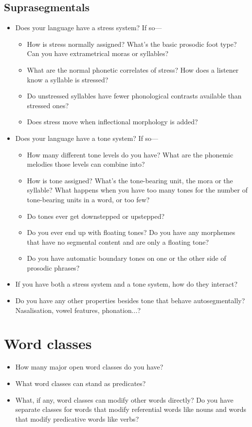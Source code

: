 \documentclass{article}
\begin{document}
\subsection{Suprasegmentals}
\begin{itemize}
  \item Does your language have a stress system? If so---
        \begin{itemize}
          \item How is stress normally assigned? What's the basic prosodic foot type? Can you have extrametrical moras or syllables?
          \item What are the normal phonetic correlates of stress? How does a listener know a syllable is stressed?
          \item Do unstressed syllables have fewer phonological contrasts available than stressed ones?
          \item Does stress move when inflectional morphology is added?
        \end{itemize}
  \item Does your language have a tone system? If so---
        \begin{itemize}
          \item How many different tone levels do you have? What are the phonemic melodies those levels can combine into?
          \item How is tone assigned? What's the tone-bearing unit, the mora or the syllable? What happens when you have too many tones for the number of tone-bearing units in a word, or too few?
          \item Do tones ever get downstepped or upstepped?
          \item Do you ever end up with floating tones? Do you have any morphemes that have no segmental content and are only a floating tone?
          \item Do you have automatic boundary tones on one or the other side of prosodic phrases?
        \end{itemize}
  \item If you have both a stress system and a tone system, how do they interact?
  \item Do you have any other properties besides tone that behave autosegmentally? Nasalisation, vowel features, phonation...?
\end{itemize}

\section{Word classes}%
\begin{itemize}
  \item How many major open word classes do you have?
  \item What word classes can stand as predicates?
  \item What, if any, word classes can modify other words directly? Do you have separate classes for words that modify referential words like nouns and words that modify predicative words like verbs?
\end{itemize}
\end{document}
